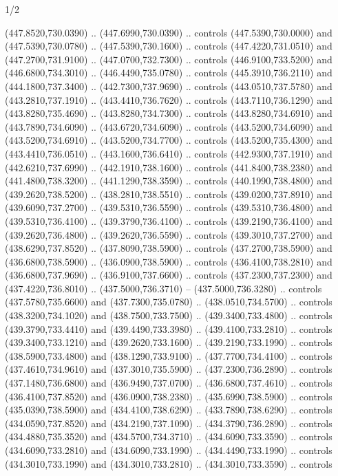 \begin{flagdescription}{1/2}
\begin{scope}[xshift=0.5\flaglength]
\begin{scope}[scale=0.00745\flagwidth,xshift=-12.1mm,yshift=41.7mm]
\begin{scope}[y=0.80pt, x=0.80pt, yscale=-1, xscale=1, inner sep=0pt, outer sep=0pt]
\begin{scope}[cm={{1.33333,0.0,0.0,-1.33333,(0.0,114.66667)}}]
\begin{scope}[scale=0.100]
  (447.8520,730.0390) .. (447.6990,730.0390) .. controls (447.5390,730.0000) and
  (447.5390,730.0780) .. (447.5390,730.1600) .. controls (447.4220,731.0510) and
  (447.2700,731.9100) .. (447.0700,732.7300) .. controls (446.9100,733.5200) and
  (446.6800,734.3010) .. (446.4490,735.0780) .. controls (445.3910,736.2110) and
  (444.1800,737.3400) .. (442.7300,737.9690) .. controls (443.0510,737.5780) and
  (443.2810,737.1910) .. (443.4410,736.7620) .. controls (443.7110,736.1290) and
  (443.8280,735.4690) .. (443.8280,734.7300) .. controls (443.8280,734.6910) and
  (443.7890,734.6090) .. (443.6720,734.6090) .. controls (443.5200,734.6090) and
  (443.5200,734.6910) .. (443.5200,734.7700) .. controls (443.5200,735.4300) and
  (443.4410,736.0510) .. (443.1600,736.6410) .. controls (442.9300,737.1910) and
  (442.6210,737.6990) .. (442.1910,738.1600) .. controls (441.8400,738.2380) and
  (441.4800,738.3200) .. (441.1290,738.3590) .. controls (440.1990,738.4800) and
  (439.2620,738.5200) .. (438.2810,738.5510) .. controls (439.0200,737.8910) and
  (439.6090,737.2700) .. (439.5310,736.5590) .. controls (439.5310,736.4800) and
  (439.5310,736.4100) .. (439.3790,736.4100) .. controls (439.2190,736.4100) and
  (439.2620,736.4800) .. (439.2620,736.5590) .. controls (439.3010,737.2700) and
  (438.6290,737.8520) .. (437.8090,738.5900) .. controls (437.2700,738.5900) and
  (436.6800,738.5900) .. (436.0900,738.5900) .. controls (436.4100,738.2810) and
  (436.6800,737.9690) .. (436.9100,737.6600) .. controls (437.2300,737.2300) and
  (437.4220,736.8010) .. (437.5000,736.3710) -- (437.5000,736.3280) .. controls
  (437.5780,735.6600) and (437.7300,735.0780) .. (438.0510,734.5700) .. controls
  (438.3200,734.1020) and (438.7500,733.7500) .. (439.3400,733.4800) .. controls
  (439.3790,733.4410) and (439.4490,733.3980) .. (439.4100,733.2810) .. controls
  (439.3400,733.1210) and (439.2620,733.1600) .. (439.2190,733.1990) .. controls
  (438.5900,733.4800) and (438.1290,733.9100) .. (437.7700,734.4100) .. controls
  (437.4610,734.9610) and (437.3010,735.5900) .. (437.2300,736.2890) .. controls
  (437.1480,736.6800) and (436.9490,737.0700) .. (436.6800,737.4610) .. controls
  (436.4100,737.8520) and (436.0900,738.2380) .. (435.6990,738.5900) .. controls
  (435.0390,738.5900) and (434.4100,738.6290) .. (433.7890,738.6290) .. controls
  (434.0590,737.8520) and (434.2190,737.1090) .. (434.3790,736.2890) .. controls
  (434.4880,735.3520) and (434.5700,734.3710) .. (434.6090,733.3590) .. controls
  (434.6090,733.2810) and (434.6090,733.1990) .. (434.4490,733.1990) .. controls
  (434.3010,733.1990) and (434.3010,733.2810) .. (434.3010,733.3590) .. controls

\end{scope}
\end{scope}
\end{scope}
\end{scope}
\end{scope}
\end{flagdescription}
